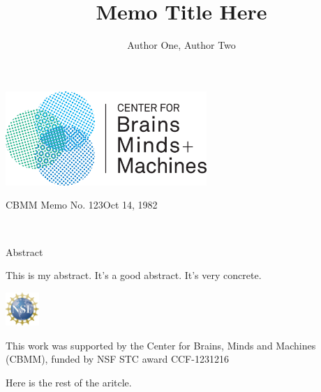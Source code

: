 \documentclass[12pt,titlepage]{article}
\title{Memo Title Here}         %
\author{Author One, Author Two} %
\begin{document}
\begin{titlingpage}
\begin{center}
  \includegraphics[width=3in]{cbmm}
\end{center}
\vspace{40pt}
\noindent
\begin{large}
  CBMM Memo No. 123\hfill Oct 14, 1982
\end{large}
\vspace{20pt}
\begin{center}
  \begin{huge}\thetitle \end{huge}
  \\
  \vspace{20pt}
  \begin{large}\theauthor \end{large}
\end{center}
\begin{center}
  \begin{large} \begin{bfseries} Abstract \end{bfseries} \end{large}
\end{center}

This is my abstract. It's a good abstract. It's very concrete. \lipsum[1] \lipsum[2]


\vfill
\begin{minipage}{0.05\textwidth}
\includegraphics[width=0.5in]{nsf4}
\end{minipage}
\hfill
\begin{minipage}{0.80\textwidth}
  \begin{large}
    This work was supported by the Center for Brains, Minds and
    Machines (CBMM), funded by NSF STC award CCF-1231216
  \end{large}
\end{minipage}

\end{titlingpage}

Here is the rest of the aritcle. \lipsum[1] %
\end{document}
